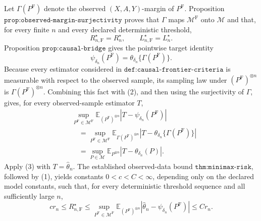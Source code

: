 Let \(\Gamma(P^{\mathrm F})\) denote the observed \((X,A,Y)\)-margin of \(P^{\mathrm F}\).  Proposition \(\texttt{prop:observed-margin-surjectivity}\) proves that \(\Gamma\) maps \(\mathcal M^{\mathrm F}\) onto \(\mathcal M\) and that, for every finite \(n\) and every declared deterministic threshold,
\[
 R_{n,\mathrm F}^\star=R_n^\star,
 \qquad
 L_{n,\mathrm F}^\star=L_n^\star. \tag{1}
\]
Proposition \(\texttt{prop:causal-bridge}\) gives the pointwise target identity
\[
 \psi_{\delta_n}(P^{\mathrm F})
 =\theta_{\delta_n}\{\Gamma(P^{\mathrm F})\}. \tag{2}
\]
Because every estimator considered in \(\texttt{def:causal-frontier-criteria}\) is measurable with respect to the observed sample, its sampling law under \((P^{\mathrm F})^{\otimes n}\) is \(\Gamma(P^{\mathrm F})^{\otimes n}\).  Combining this fact with (2), and then using the surjectivity of \(\Gamma\), gives, for every observed-sample estimator \(T\),
\[
 \begin{aligned}
 &\sup_{P^{\mathrm F}\in\mathcal M^{\mathrm F}}
 \mathbb E_{(P^{\mathrm F})^{\otimes n}}
 \left|T-\psi_{\delta_n}(P^{\mathrm F})\right| \\
 &\quad=
 \sup_{P^{\mathrm F}\in\mathcal M^{\mathrm F}}
 \mathbb E_{\Gamma(P^{\mathrm F})^{\otimes n}}
 \left|T-\theta_{\delta_n}\{\Gamma(P^{\mathrm F})\}\right| \\
 &\quad=
 \sup_{P\in\mathcal M}
 \mathbb E_{P^{\otimes n}}
 \left|T-\theta_{\delta_n}(P)\right|. \tag{3}
 \end{aligned}
\]
Apply (3) with \(T=\widehat\theta_n\).  The established observed-data bound \(\texttt{thm:minimax-risk}\), followed by (1), yields constants \(0<c<C<\infty\), depending only on the declared model constants, such that, for every deterministic threshold sequence and all sufficiently large \(n\),
\[
 c r_n
 \leq R_{n,\mathrm F}^\star
 \leq
 \sup_{P^{\mathrm F}\in\mathcal M^{\mathrm F}}
 \mathbb E_{(P^{\mathrm F})^{\otimes n}}
 \left|\widehat\theta_n-\psi_{\delta_n}(P^{\mathrm F})\right|
 \leq C r_n. \tag{4}
\]

